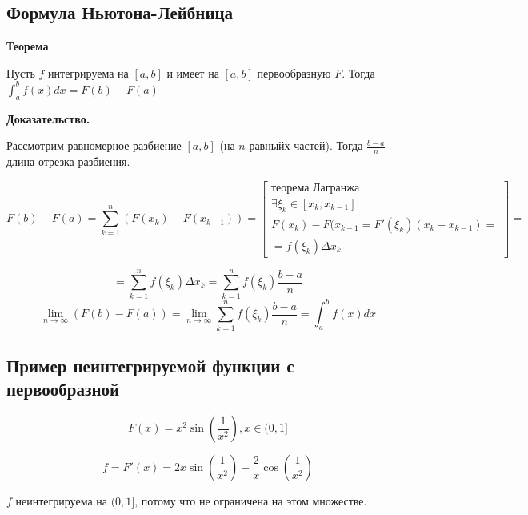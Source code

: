 \documentclass[a4paper]{article}
\begin{document}
\begin{definit}
\hypertarget{p13}{}
\subsection*{Формула Ньютона-Лейбница}

\begin{htheorem}\textbf{Теорема}.

Пусть $f$ интегрируема на $[a,b]$ и имеет на $[a,b]$ первообразную $F$. Тогда $\int_a^b f(x)dx = F(b) - F(a)$
\end{htheorem}

\begin{hproof}\textbf{Доказательство.}

Рассмотрим равномерное разбиение $[a,b]$ (на $n$ равныйх частей). Тогда $\frac{b-a}{n}$ - длина отрезка разбиения.

\[
F(b) - F(a) = \sum_{k=1}^n (F(x_k) - F(x_{k-1})) = \begin{bmatrix}
\text{теорема Лагранжа} \\
\exists \xi_k \in [x_k, x_{k-1}]: \\
F(x_k)-F(x_{k-1} = F'(\xi_k)(x_k-x_{k-1}) = \\ = f(\xi_k) \Delta x_k
\end{bmatrix} = 
\]

\[
 = \sum_{k=1}^n f(\xi_k) \Delta x_k = \sum_{k=1}^n f(\xi_k) \frac{b-a}{n}
\]
\[
\lim_{n \rightarrow \infty} (F(b)-F(a)) = \lim_{n \rightarrow \infty} \sum_{k=1}^n f(\xi_k) \frac{b-a}{n} = \int_a^b f(x)dx
\]
\end{hproof}

\end{definit}

\begin{definit}
\hypertarget{p14}{}
\subsection*{Пример неинтегрируемой функции с первообразной}

\[
F(x) = x^2 \sin \left( \frac{1}{x^2} \right), x \in (0,1]
\]

\[
f = F'(x) = 2x \sin \left( \frac{1}{x^2} \right) - \frac{2}{x} \cos \left( \frac{1}{x^2} \right)
\]

$f$ неинтегрируема на $(0,1]$, потому что не ограничена на этом множестве.
\end{definit}
\end{document}
